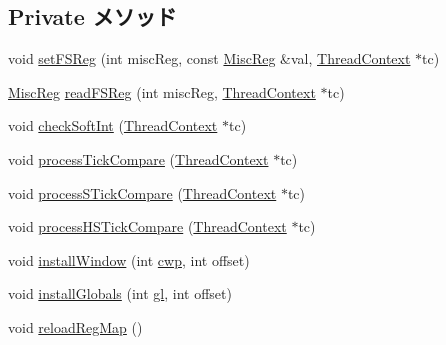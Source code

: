 \subsection*{Private メソッド}
\begin{DoxyCompactItemize}
\item 
void \hyperlink{classSparcISA_1_1ISA_af746bd351f28656415fa83508c51f99d}{setFSReg} (int miscReg, const \hyperlink{namespaceSparcISA_aa16539aa6584fd12f7d6fa868f75b4de}{MiscReg} \&val, \hyperlink{classThreadContext}{ThreadContext} $\ast$tc)
\item 
\hyperlink{namespaceSparcISA_aa16539aa6584fd12f7d6fa868f75b4de}{MiscReg} \hyperlink{classSparcISA_1_1ISA_ae5670dc7b39c2d746bb37c321aea7c6f}{readFSReg} (int miscReg, \hyperlink{classThreadContext}{ThreadContext} $\ast$tc)
\item 
void \hyperlink{classSparcISA_1_1ISA_ae02c952584deaa6119c15c810faf6d54}{checkSoftInt} (\hyperlink{classThreadContext}{ThreadContext} $\ast$tc)
\item 
void \hyperlink{classSparcISA_1_1ISA_a6c81ced7d761098b6a3b733c6e70e041}{processTickCompare} (\hyperlink{classThreadContext}{ThreadContext} $\ast$tc)
\item 
void \hyperlink{classSparcISA_1_1ISA_a69feece7c04b8dc0567ec5050e809913}{processSTickCompare} (\hyperlink{classThreadContext}{ThreadContext} $\ast$tc)
\item 
void \hyperlink{classSparcISA_1_1ISA_a3ad754d09a0ae2ad17746198b0d3563d}{processHSTickCompare} (\hyperlink{classThreadContext}{ThreadContext} $\ast$tc)
\item 
void \hyperlink{classSparcISA_1_1ISA_ad1a90ae0758b89c2260267de79805f93}{installWindow} (int \hyperlink{classSparcISA_1_1ISA_a58c702bc16d587a7bd7a38d609dea6d8}{cwp}, int offset)
\item 
void \hyperlink{classSparcISA_1_1ISA_a8bccf96ba4158dc5a446b2236c8743ae}{installGlobals} (int \hyperlink{classSparcISA_1_1ISA_a285fa13127daefc218bebcdb2437ad1a}{gl}, int offset)
\item 
void \hyperlink{classSparcISA_1_1ISA_a3425c21bb9f49c5ebcd3cddc2d1ec247}{reloadRegMap} ()
\end{DoxyCompactItemize}
